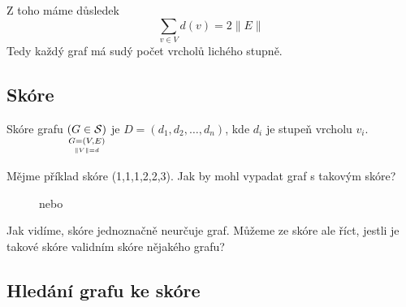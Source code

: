 Z toho máme důsledek
\begin{equation}
    \sum_{v \in V} d(v) = 2 \|E\|
\end{equation}
Tedy každý graf má sudý počet vrcholů lichého stupně.

\subsection{Skóre}
Skóre grafu $\underset{\underset{\|V\|=d}{G=(V,E)}}{(G \in \S)}$ je $D = (d_1, d_2, \dots, d_n)$, kde $d_i$ je stupeň 
vrcholu $v_i$.

Mějme příklad skóre (1,1,1,2,2,3). Jak by mohl vypadat graf s takovým skóre?
\begin{figure}[H]
    \centering
    \begin{minipage}[c]{0.25\textwidth}
        \begin{figure}[H]
        \end{figure}
    \end{minipage}%
    \hspace{0\textwidth}
    nebo
    \hspace{0.05\textwidth}
    \begin{minipage}[c]{0.25\textwidth}
        \begin{figure}[H]
        \end{figure}
    \end{minipage}
\end{figure}
Jak vidíme, skóre jednoznačně neurčuje graf. Můžeme ze skóre ale říct, jestli je takové skóre validním skóre nějakého 
grafu?

\subsection{Hledání grafu ke skóre}

